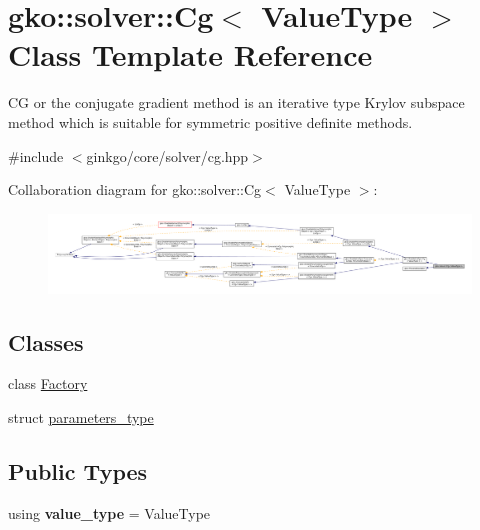 \hypertarget{classgko_1_1solver_1_1Cg}{}\section{gko\+:\+:solver\+:\+:Cg$<$ Value\+Type $>$ Class Template Reference}
\label{classgko_1_1solver_1_1Cg}


CG or the conjugate gradient method is an iterative type Krylov subspace method which is suitable for symmetric positive definite methods.  




{\ttfamily \#include $<$ginkgo/core/solver/cg.\+hpp$>$}



Collaboration diagram for gko\+:\+:solver\+:\+:Cg$<$ Value\+Type $>$\+:
\nopagebreak
\begin{figure}[H]
\begin{center}
\leavevmode
\includegraphics[width=350pt]{classgko_1_1solver_1_1Cg__coll__graph}
\end{center}
\end{figure}
\subsection*{Classes}
\begin{DoxyCompactItemize}
\item 
class \hyperlink{classgko_1_1solver_1_1Cg_1_1Factory}{Factory}
\item 
struct \hyperlink{structgko_1_1solver_1_1Cg_1_1parameters__type}{parameters\+\_\+type}
\end{DoxyCompactItemize}
\subsection*{Public Types}
\begin{DoxyCompactItemize}
\item 
\mbox{\label{classgko_1_1solver_1_1Cg_a010f8f5b0b315108a3990052a73f80b0}} 
using {\bfseries value\+\_\+type} = Value\+Type
\end{DoxyCompactItemize}
